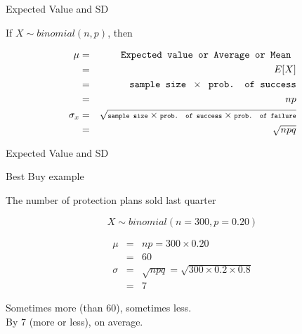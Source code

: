 \documentclass[14pt]{beamer}\usepackage[]{graphicx}\usepackage[]{color}
\begin{document}
\begin{frame}[fragile]{Expected Value and SD}

If $ X \sim binomial(n, p) $, then 

\begin{eqnarray*}
\mu &=& \texttt{ Expected value or Average or Mean } \\
&=& E[X] \\
&=& \texttt{ sample size } \times \texttt{ prob. of success} \\
&=& np \\
\sigma_x &=& {\scriptsize{\sqrt{ \texttt{sample size} \times \texttt{prob. of success} \times \texttt{prob. of failure} }}} \\
&=& \sqrt{npq} 
\end{eqnarray*}

\end{frame}

\begin{frame}[fragile]{Expected Value and SD}

\vspace{-1cm}

\begin{center}{\tiny{Best Buy example}} \end{center}

The number of protection plans sold last quarter

$$X \sim binomial(n = 300, p = 0.20) $$

\vspace{-1cm}

\begin{eqnarray*}
\mu &=& np = 300 \times 0.20 \\
&=& 60 \\
\sigma &=& \sqrt{npq} = \sqrt{300 \times 0.2 \times 0.8} \\
&=& 7 
\end{eqnarray*}

Sometimes more (than 60), sometimes less. \\ By 7 (more or less), on average.
  
\end{frame}
\end{document}
